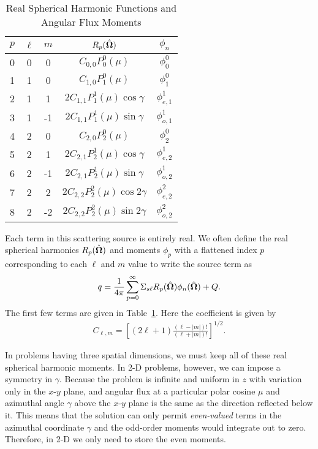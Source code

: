 \begin{table}[tb!]
\caption{Real Spherical Harmonic Functions and Angular Flux Moments}
\begin{center}
\begin{tabular}{|c|c|c|c|c|} \hline
  $p$ 	& $\ell$ 	& $m$  	& $R_p(\hat{\mathbf{\Omega}})$						& $\phi_n$ 			\\ \hline
  0		& 0			& 0		& $C_{0,0} P_0^0(\mu)$ 				& $\phi_0^0$		\\ \hline
  1		& 1			& 0		& $C_{1,0} P_1^0(\mu)$ 				& $\phi_1^0$		\\ 
  2		& 1			& 1		& $2C_{1,1} P_1^1(\mu) \cos \gamma$ & $\phi_{e,1}^1$	\\ 
  3		& 1			& -1	& $2C_{1,1} P_1^1(\mu) \sin \gamma$ & $\phi_{o,1}^1$	\\ \hline
  4		& 2			& 0		& $C_{2,0} P_2^0(\mu)$ 				& $\phi_2^0$		\\ 
  5		& 2			& 1		& $2C_{2,1} P_2^1(\mu) \cos \gamma$ & $\phi_{e,2}^1$	\\ 
  6		& 2			& -1	& $2C_{2,1} P_2^1(\mu) \sin \gamma$ & $\phi_{o,2}^1$	\\ 
  7		& 2			& 2		& $2C_{2,2} P_2^2(\mu) \cos 2\gamma$ & $\phi_{e,2}^2$	\\ 
  8		& 2			& -2	& $2C_{2,2} P_2^2(\mu) \sin 2\gamma$ & $\phi_{o,2}^2$	\\ \hline
\end{tabular}
\end{center}
\label{Table:transport_realSphericalHarmonics}
\end{table}%


Each term in this scattering source is entirely real. We often define the real spherical harmonics $R_p(\hat{\mathbf{\Omega}})$ and moments $\phi_p$ with a flattened index $p$ corresponding to each $\ell$ and $m$ value to write the source term as
\begin{align}
  q = \frac{1}{4\pi} \sum_{p = 0}^\infty \Sigma_{s\ell} R_p(\hat{\mathbf{\Omega}}) \phi_n(\hat{\mathbf{\Omega}}) + Q .
\end{align}
The first few terms are given in Table~\ref{Table:transport_realSphericalHarmonics}. Here the coefficient is given by
\begin{align}
  C_{\ell,m} = \left[ ( 2\ell + 1 )\frac{ ( \ell - | m | ) ! }{ ( \ell + | m | )! } \right]^{1/2} .
\end{align}

In problems having three spatial dimensions, we must keep all of these real spherical harmonic moments. In 2-D problems, however, we can impose a symmetry in $\gamma$. Because the problem is infinite and uniform in $z$ with variation only in the $x$-$y$ plane, and angular flux at a particular polar cosine $\mu$ and azimuthal angle $\gamma$ above the $x$-$y$ plane is the same as the direction reflected below it. This means that the solution can only permit \emph{even-valued} terms in the azimuthal coordinate $\gamma$ and the odd-order moments would integrate out to zero. Therefore, in 2-D we only need to store the even moments.

